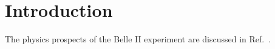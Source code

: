 \chapter{Introduction}\label{sec:Introduction}

The physics prospects of the Belle II experiment are discussed in Ref.~\cite{Belle-II:2018jsg}.